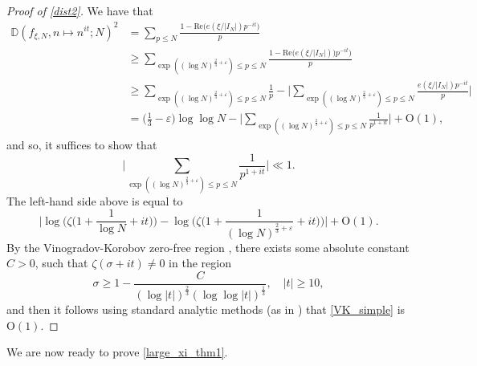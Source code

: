 \documentclass[letter,11pt]{article}
\theoremstyle{plain} %
\theoremstyle{definition} %
\theoremstyle{plain}
\theoremstyle{plain}
\theoremstyle{plain}
\numberwithin{equation}{section}
\newcommand{\Oh}{{\mathrm O}}
\renewcommand{\epsilon}{\varepsilon}
\renewcommand{\leq}{\leqslant}
\renewcommand{\geq}{\geqslant}
\renewcommand{\Re}{\mathrm{Re}}
\newcommand{\Dist}{\mathbb{D}}
\newcommand{\1}{\mathbbm{1}}
\newcommand{\f}{f_{\xi,N}}
\begin{document}
\begin{proof}[Proof of \cref{dist2}]
We have that
\begin{align*}
    \Dist(\f,n\mapsto n^{it};N)^2 &= \sum_{p\leq N}\frac{1-\Re\big(e(\xi/|I_N|)p^{-it}\big)}{p} \\
    &\geq \sum_{\exp((\log{N})^{\frac{2}{3}+\epsilon})\leq p\leq N} \frac{1-\Re\big(e(\xi/|I_N|))p^{-it}\big)}{p} \\
    & \geq \sum_{\exp((\log{N})^{\frac{2}{3}+\epsilon})\leq p\leq N}\frac{1}{p}-\Bigg|\sum_{\exp((\log{N})^{\frac{2}{3}+\epsilon})\leq p\leq N}\frac{e(\xi/|I_N|)p^{-it}}{p}\Bigg| \\ 
    &= \bigg(\frac{1}{3}-\epsilon\bigg)\log\log{N}-\Bigg|\sum_{\exp((\log{N})^{\frac{2}{3}+\epsilon})\leq p\leq N}\frac{1}{p^{1+it}}\Bigg|+\Oh(1),
\end{align*}
and so, it suffices to show that $$\Bigg|\sum_{\exp((\log{N})^{\frac{2}{3}+\epsilon})\leq p\leq N}\frac{1}{p^{1+it}}\Bigg|\ll 1.$$ 
The left-hand side above is equal to 
\begin{equation}\label{VK_simple}
    \bigg|\log\bigg(\zeta\bigg(1+\frac{1}{\log{N}}+it\bigg)\bigg) - \log\bigg(\zeta\bigg(1+\frac{1}{(\log{N})^{\frac{2}{3}+\epsilon}}+it\bigg)\bigg)\bigg|+\Oh(1).
\end{equation}
By the Vinogradov-Korobov zero-free region \cite{Korobov_zero-free,Vinogradov_zero-free}, there exists some absolute constant $C>0$, such that $\zeta(\sigma+it)\neq0$ in the region
$$\sigma\geq 1-\frac{C}{(\log|t|)^{\frac{2}{3}}(\log\log|t|)^{\frac{1}{3}}}, \quad |t|\geq 10,$$
and then
it follows using standard analytic methods
(as in \cite{richert}) that \eqref{VK_simple} is $\Oh(1)$.
\end{proof}

We are now ready to prove \cref{large_xi_thm1}.
\end{document}
